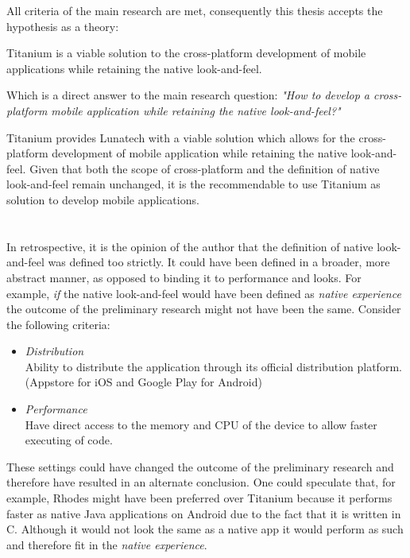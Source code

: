 \noindent All criteria of the main research are met, consequently this thesis accepts the hypothesis as a theory:

\begin{shadequote}
Titanium is a viable solution to the cross-platform development of mobile applications while retaining the native look-and-feel.%
\end{shadequote}

\noindent Which is a direct answer to the main research question: \emph{"How to develop a cross-platform mobile application while retaining the native look-and-feel?"}

%
%
Titanium provides Lunatech with a viable solution which allows for the cross-platform development of mobile application while retaining the native look-and-feel. Given that both the scope of cross-platform and the definition of native look-and-feel remain unchanged, it is the recommendable to use Titanium as solution to develop mobile applications.
\\~\\~\\
In retrospective, it is the opinion of the author that the definition of native look-and-feel was defined too strictly. It could have been defined in a broader, more abstract manner, as opposed to binding it to performance and looks. For example, \emph{if} the native look-and-feel would have been defined as \emph{native experience} the outcome of the preliminary research might not have been the same. Consider the following criteria:
\begin{itemize}
\item \emph{Distribution}\\
Ability to distribute the application through its official distribution platform. (Appstore for iOS and Google Play for Android)
\item \emph{Performance}\\
Have direct access to the memory and CPU of the device to allow faster executing of code.
\end{itemize}
\noindent These settings could have changed the outcome of the preliminary research and therefore have resulted in an alternate conclusion. One could speculate that, for example, Rhodes might have been preferred over Titanium because it performs faster as native Java applications on Android due to the fact that it is written in C.\cite{Rhodes2012} Although it would not look the same as a native app it would perform as such and therefore fit in the \emph{native experience}.

